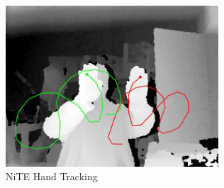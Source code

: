 \begin{figure}
	[h] \centering 
	\includegraphics[height=6cm]{figures/content/ni-hand.jpg} \caption{NiTE Hand Tracking} \label{fg:ni:hand} 
\end{figure}
